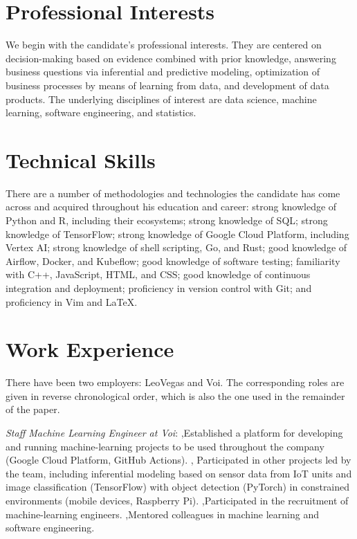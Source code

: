 \documentclass[journal]{IEEEtran}
\begin{document}
\section{Professional Interests} 

We begin with the candidate's professional interests. They are centered on
decision-making based on evidence combined with prior knowledge, answering
business questions via inferential and predictive modeling, optimization of
business processes by means of learning from data, and development of data
products. The underlying disciplines of interest are data science, machine
learning, software engineering, and statistics.

\section{Technical Skills} 

There are a number of methodologies and technologies the candidate has come
across and acquired throughout his education and career: strong knowledge of
Python and R, including their ecosystems; strong knowledge of SQL; strong
knowledge of TensorFlow; strong knowledge of Google Cloud Platform, including
Vertex AI; strong knowledge of shell scripting, Go, and Rust; good knowledge of
Airflow, Docker, and Kubeflow; good knowledge of software testing; familiarity
with C++, JavaScript, HTML, and CSS; good knowledge of continuous integration
and deployment; proficiency in version control with Git; and proficiency in Vim
and LaTeX.

\section{Work Experience} 

There have been two employers: LeoVegas and Voi. The corresponding roles are
given in reverse chronological order, which is also the one used in the
remainder of the paper.

\date{February 2022--Present} \emph{Staff Machine Learning Engineer at Voi}:
\sep Established a platform for developing and running machine-learning projects
to be used throughout the company (Google Cloud Platform, GitHub Actions). \sep
Participated in other projects led by the team, including inferential modeling
based on sensor data from IoT units and image classification (TensorFlow) with
object detection (PyTorch) in constrained environments (mobile devices,
Raspberry Pi). \sep Participated in the recruitment of machine-learning
engineers. \sep Mentored colleagues in machine learning and software
engineering.
\end{document}
